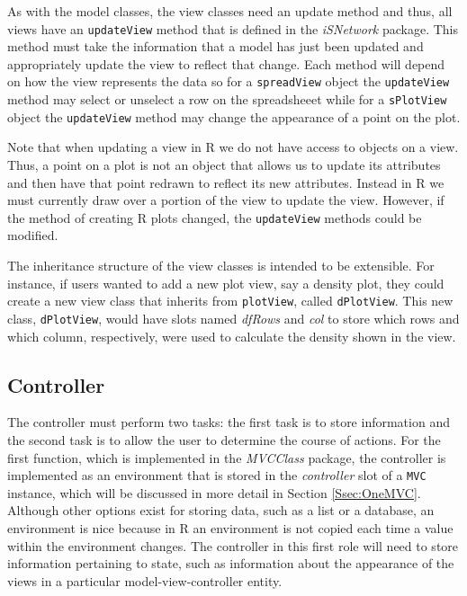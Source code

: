 \documentclass{article}[11pt]
\newcommand{\Rfunction}[1]{{\texttt{#1}}}
\newcommand{\Robject}[1]{{\texttt{#1}}}
\newcommand{\Rpackage}[1]{{\textit{#1}}}
\newcommand{\Rslot}[1]{\textsl{#1}}
\begin{document}
As with the model classes, the view classes need an update method and thus, all
views have an \Rfunction{updateView} method that is defined in the
\Rpackage{iSNetwork} package.  This method must take the
information that a model has just been updated and appropriately update the
view to reflect that change.  Each method will depend on how the view
represents the data so for a \Robject{spreadView} object the
\Rfunction{updateView} method may select or unselect a row on the spreadsheeet
while for a \Robject{sPlotView} object the \Rfunction{updateView} method may
change the appearance of a point on the plot.  

Note that when updating a view in R we do not have access to objects on a
view.  Thus, a point on a plot is not an object that allows us to update its
attributes and then have that point redrawn to reflect its new attributes.
Instead in R we must currently draw over a portion of the view to update the
view.  However, if the method of creating R plots changed, the
\Rfunction{updateView} methods could be modified. 

The inheritance structure of the view classes is intended to be extensible.
For instance, if users wanted to add a new plot view, say a density plot, they
could create a new view class that inherits from \Robject{plotView}, called
\Robject{dPlotView}.  This new class, \Robject{dPlotView}, would have slots
named \Rslot{dfRows} and \Rslot{col} to store which rows and which column,
respectively, were used to calculate the density shown in the view.

\subsection{Controller}\label{Ssec:OneCont}

The controller must perform two tasks: the first task is to store information
and the second task is to allow the user to determine the course of actions.
For the first function, which is implemented in the \Rpackage{MVCClass}
package, the controller is implemented as an environment that is stored in the
\Rslot{controller} slot of a \Robject{MVC} instance, which will be discussed in
more detail in Section \ref{Ssec:OneMVC}.  Although other options exist for
storing data, such as a list or a database, an environment is nice because in
R an environment is not copied each time a value within the environment
changes.  The controller in this first role will need to store information
pertaining to state, such as information about the appearance of the views in
a particular model-view-controller entity.
\end{document}
